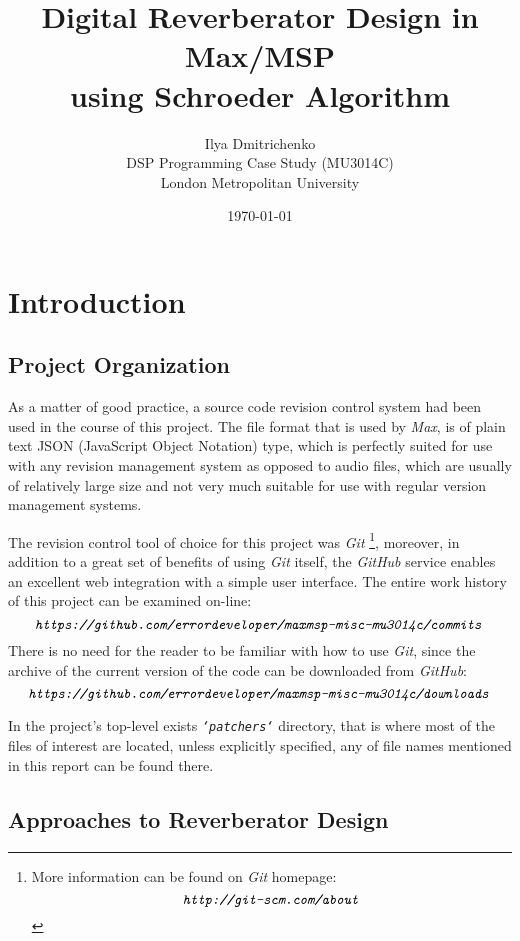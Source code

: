 \documentclass[12pt]{report}
\title{Digital Reverberator Design in Max/MSP\\using Schroeder Algorithm}
\author{Ilya Dmitrichenko
\\\small DSP Programming Case Study (MU3014C)
\\\small London Metropolitan University}
\date{\today}
\newcommand{\URL}[1]{\[ \texttt{\emph{#1}} \]}
\newcommand{\href}[2]{#2 (\texttt{\emph{\url{#1}}})} %
\newcommand{\Href}[2]{{#2}} %
\newcommand{\Href}[2]{\href{#1}{#2}} %
\newcommand{\URL}[1]{\[ \Href{#1}{\texttt{\emph{#1}}} \]}
\begin{document}
\maketitle


\section{Introduction}

  \subsection{Project Organization}

  As a matter of good practice, a source code revision control system had
  been used in the course of this project. The file format that is used by
  \emph{Max}, is of plain text JSON (JavaScript Object Notation) type, which
  is perfectly suited for use with any revision management system as opposed
  to audio files, which are usually of relatively large size and not very
  much suitable for use with regular version management systems. 

  The revision control tool of choice for this project was \emph{Git}
  \footnote{More information can be found on \emph{Git} homepage:
  \URL{http://git-scm.com/about}}, moreover, in addition to a great set of
  benefits of using \emph{Git} itself, the \emph{GitHub} service enables an
  excellent web integration with a simple user interface. The entire work
  history of this project can be examined on-line:
  \URL{https://github.com/errordeveloper/maxmsp-misc-mu3014c/commits}
  There is no need for the reader to be familiar with how to use \emph{Git},
  since the archive of the current version of the code can be downloaded
  from \emph{GitHub}:
  \URL{https://github.com/errordeveloper/maxmsp-misc-mu3014c/downloads}


  In the project's top-level exists \emph{\texttt{`patchers`}} directory, that
  is where most of the files of interest are located, unless explicitly specified,
  any of file names mentioned in this report can be found there.


  \subsection{Approaches to Reverberator Design}
\end{document}
